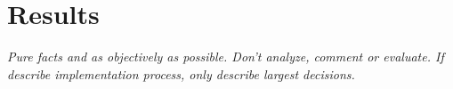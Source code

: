 \chapter{Results}\label{cha:Results}

\textit{Pure facts and as objectively as possible. Don't analyze, comment or evaluate.  If describe implementation process, only describe largest decisions.}


\newpage


\newpage




\newpage


\newpage


\newpage


\newpage


\newpage















